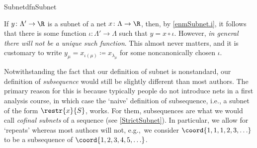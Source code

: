 \begin{dfn}{Subnet}{dfnSubnet}
\begin{rmk}
\end{rmk}
\begin{rmk}
If $y\colon \Lambda '\rightarrow \R$ is a subnet of a net $x\colon \Lambda \rightarrow \R$, then, by \cref{enmSubnet.i}, it follows that there is some function $\iota :\Lambda '\rightarrow \Lambda$ such that $y=x\circ \iota$.  However, \emph{in general there will not be a unique such function}.  This almost never matters, and it is customary to write $y_{\mu}=x_{\iota (\mu)}\coloneqq x_{\lambda _\mu}$ for some noncanonically chosen $\iota$.
\end{rmk}
\begin{rmk}
Notwithstanding the fact that our definition of subnet is nonstandard, our definition of \emph{subsequence} would still be slightly different than most authors.  The primary reason for this is because typically people do not introduce nets in a first analysis course, in which case the `naive' definition of subsequence, i.e., a subnet of the form $\restr{x}{S}$, works.  For them, subsequences are what we would call \emph{cofinal subnets} of a sequence (see \cref{StrictSubnet}).  In particular, we allow for `repeats' whereas most authors will not, e.g.,~we consider $\coord{1,1,1,2,3,\ldots}$ to be a subsequence of $\coord{1,2,3,4,5,\ldots}$.
\end{rmk}
\end{dfn}
